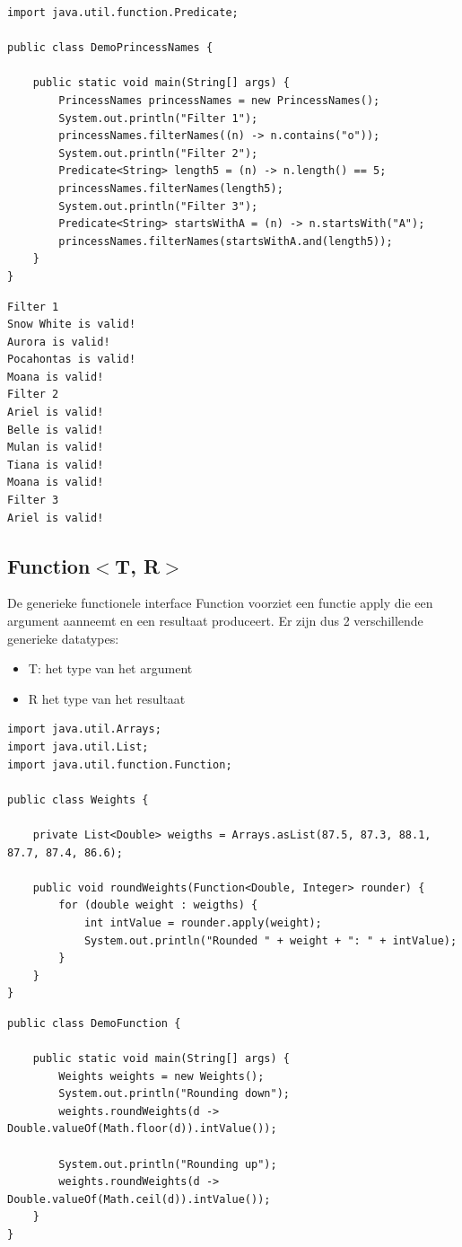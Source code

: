 \documentclass{tstextbook}
\begin{document}
\begin{lstlisting}
import java.util.function.Predicate;

public class DemoPrincessNames {

	public static void main(String[] args) {
		PrincessNames princessNames = new PrincessNames();
		System.out.println("Filter 1");
		princessNames.filterNames((n) -> n.contains("o"));
		System.out.println("Filter 2");
		Predicate<String> length5 = (n) -> n.length() == 5;
		princessNames.filterNames(length5);
		System.out.println("Filter 3");
		Predicate<String> startsWithA = (n) -> n.startsWith("A");
		princessNames.filterNames(startsWithA.and(length5));
	}
}
\end{lstlisting}

\begin{verbatim}
Filter 1
Snow White is valid!
Aurora is valid!
Pocahontas is valid!
Moana is valid!
Filter 2
Ariel is valid!
Belle is valid!
Mulan is valid!
Tiana is valid!
Moana is valid!
Filter 3
Ariel is valid!
\end{verbatim}

\subsection{Function$<$T, R$>$}

De generieke functionele interface Function voorziet een functie apply die een argument aanneemt en een resultaat produceert. Er zijn dus 2 verschillende generieke datatypes:
\begin{itemize}
\item T: het type van het argument 
\item R het type van het resultaat
\end{itemize}

\begin{lstlisting}
import java.util.Arrays;
import java.util.List;
import java.util.function.Function;

public class Weights {

	private List<Double> weigths = Arrays.asList(87.5, 87.3, 88.1, 87.7, 87.4, 86.6);

	public void roundWeights(Function<Double, Integer> rounder) {
		for (double weight : weigths) {
			int intValue = rounder.apply(weight);
			System.out.println("Rounded " + weight + ": " + intValue);
		}
	}
}
\end{lstlisting}

\begin{lstlisting}
public class DemoFunction {

	public static void main(String[] args) {
		Weights weights = new Weights();
		System.out.println("Rounding down");
		weights.roundWeights(d -> Double.valueOf(Math.floor(d)).intValue());

		System.out.println("Rounding up");
		weights.roundWeights(d -> Double.valueOf(Math.ceil(d)).intValue());
	}
}
\end{lstlisting}
\end{document}
